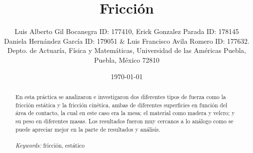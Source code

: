 \documentclass{article}
\begin{document}

\renewcommand{\footrulewidth}{1pt}
\renewcommand{\tablename}{Tabla}
\renewcommand{\figurename}{Figura}


\title{Fricción}
\author{\small{Luis Alberto Gil Bocanegra ID: 177410, Erick Gonzalez Parada ID: 178145}\\
 \small{Daniela Hernández García ID: 179051 $\&$ Luis Francisco Avila Romero ID: 177632.}\\		%
	   \small{Depto. de Actuaría, Física y Matemáticas, Universidad de las Américas Puebla, Puebla, M\'exico 72810}}
\date{\small{\today}}

\maketitle


\begin{abstract}
En esta práctica se analizaron e investigaron dos diferentes tipos de fuerza como la fricción
estática y la fricción cinética, ambas de diferentes superficies en función del área de
contacto, la cual en este caso era la mesa; el material como madera y velcro; y su peso en
diferentes masas. Los resultados fueron muy cercanos a lo análogo como se puede apreciar mejor en la parte de resultados y análisis. 
\\
\\
{\it Keywords:}  fricción, estático  
\\
\\
\end{abstract}
\end{document}
